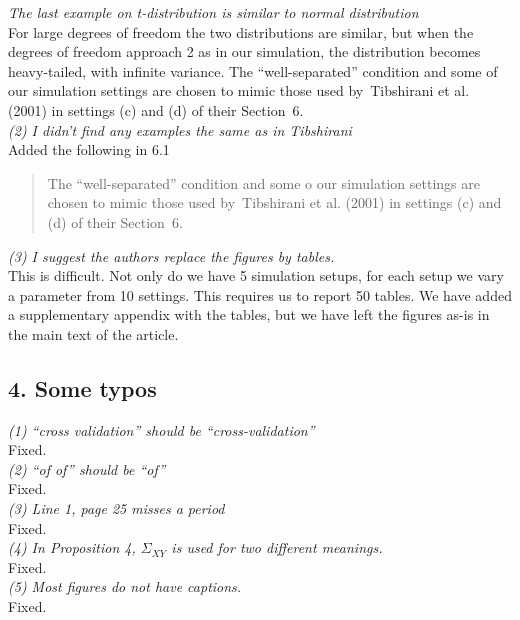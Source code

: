 \documentclass[11pt]{article}
\begin{document}
\noindent
\emph{The last example on t-distribution is similar to normal distribution}
\\

For large degrees of freedom the two distributions are similar, but when the
degrees of freedom approach 2 as in our simulation, the distribution becomes
heavy-tailed, with infinite variance.  The ``well-separated'' condition and
some of our simulation settings are chosen to mimic those used by~Tibshirani
et al. (2001) in settings (c) and (d) of their Section~6.
\\

\noindent
\emph{(2) I didn't find any examples the same as in Tibshirani}
\\

Added the following in 6.1

\begin{quote}
The ``well-separated'' condition and
some o our simulation settings are chosen to mimic those used by~Tibshirani
et al. (2001) in settings (c) and (d) of their Section~6.
\end{quote}

\noindent
\emph{(3) I suggest the authors replace the figures by tables.}
\\

This is difficult. Not only do we have 5 simulation setups, for each setup we
vary a parameter from 10 settings. This requires us to report 50 tables. We
have added a supplementary appendix with the tables, but we have left the
figures as-is in the main text of the article.


\subsection{4. Some typos}

\noindent
\emph{(1) ``cross validation'' should be ``cross-validation''}
\\

Fixed. \\

\noindent
\emph{(2) ``of of'' should be ``of''}
\\

Fixed. \\

\noindent
\emph{(3) Line 1, page 25 misses a period}
\\

Fixed. \\

\noindent
\emph{(4) In Proposition 4, $\Sigma_{XY}$ is used for two different meanings.}
\\

Fixed. \\

\noindent
\emph{(5) Most figures do not have captions.}
\\

Fixed.




\end{document}
